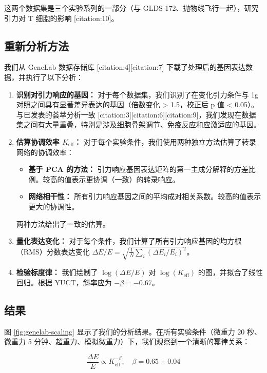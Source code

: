 \documentclass[12pt,a4paper]{article}
\theoremstyle{remark}
\newcommand{\Keff}{K_{\mathrm{eff}}}
\begin{document}
	这两个数据集是三个实验系列的一部分（与 GLDS-172、抛物线飞行一起），研究引力对 T 细胞的影响 [citation:10]。
	
	\subsection{重新分析方法}
	
	我们从 GeneLab 数据存储库 [citation:4][citation:7] 下载了处理后的基因表达数据，并执行了以下分析：
	
	\begin{enumerate}
		\item \textbf{识别对引力响应的基因：} 对于每个数据集，我们识别了在变化引力条件与 1g 对照之间具有显著差异表达的基因（倍数变化 > 1.5，校正后 p 值 < 0.05）。与已发表的荟萃分析一致 [citation:3][citation:6][citation:9]，我们发现在数据集之间有大量重叠，特别是涉及细胞骨架调节、免疫反应和应激适应的基因。
		
		\item \textbf{估算协调效率 \(\Keff\)：} 对于每个实验条件，我们使用两种独立方法估算了转录网络的协调效率：
		\begin{itemize}
			\item \textbf{基于 PCA 的方法：} 引力响应基因表达矩阵的第一主成分解释的方差比例。较高的值表示更协调（一致）的转录响应。
			\item \textbf{网络相干性：} 所有引力响应基因之间的平均成对相关系数。较高的值表示更大的协调性。
		\end{itemize}
		两种方法给出了一致的估算。
		
		\item \textbf{量化表达变化：} 对于每个条件，我们计算了所有引力响应基因的均方根（RMS）分数表达变化 \(\Delta E/E = \sqrt{\frac{1}{N}\sum_i (\Delta E_i/E_i)^2}\)。
		
		\item \textbf{检验标度律：} 我们绘制了 \(\log(\Delta E/E)\) 对 \(\log(\Keff)\) 的图，并拟合了线性回归。根据 YUCT，斜率应为 \(-\beta = -0.67\)。
	\end{enumerate}
	
	\subsection{结果}
	
	图 \ref{fig:genelab-scaling} 显示了我们的分析结果。在所有实验条件（微重力 20 秒、微重力 5 分钟、超重力、模拟微重力）下，我们观察到一个清晰的幂律关系：
	
	\begin{equation}
		\frac{\Delta E}{E} \propto \Keff^{-\beta}, \quad \beta = 0.65 \pm 0.04
		\label{eq:genelab-fit}
	\end{equation}
	
\end{document}
